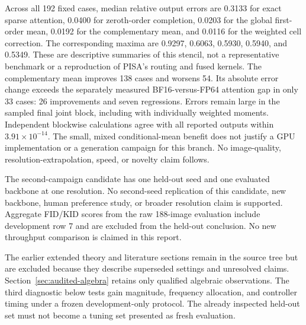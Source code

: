 Across all 192 fixed cases, median relative output errors are 0.3133 for exact
sparse attention, 0.0400 for zeroth-order completion, 0.0203 for the global
first-order mean, 0.0192 for the complementary mean, and 0.0116 for the weighted
cell correction. The corresponding maxima are 0.9297, 0.6063, 0.5930, 0.5940,
and 0.5349. These are descriptive summaries of this stencil, not a representative
benchmark or a reproduction of PISA's routing and fused kernels.
The complementary mean improves 138 cases and worsens 54. Its absolute error
change exceeds the separately measured BF16-versus-FP64 attention gap in only
33 cases: 26 improvements and seven regressions. Errors remain large in the
sampled final joint block, including with individually weighted moments.
Independent blockwise calculations agree with all reported outputs within
$3.91\times10^{-14}$. The small, mixed conditional-mean benefit does not justify
a GPU implementation or a generation campaign for this branch. No image-quality,
resolution-extrapolation, speed, or novelty claim follows.



The second-campaign candidate has one held-out seed and one evaluated backbone
at one resolution. No second-seed replication of this candidate, new backbone,
human preference study, or broader resolution claim is supported. Aggregate
FID/KID scores from the raw 188-image evaluation include development row 7 and
are excluded from the held-out conclusion. No new throughput comparison is
claimed in this report.

The earlier extended theory and literature sections remain in the source tree
but are excluded because they describe superseded settings and unresolved claims.
Section~\ref{sec:audited-algebra} retains only qualified algebraic observations.
The third diagnostic below tests gain magnitude, frequency allocation, and
controller timing under a frozen development-only protocol. The already inspected held-out set must not become a
tuning set presented as fresh evaluation.


